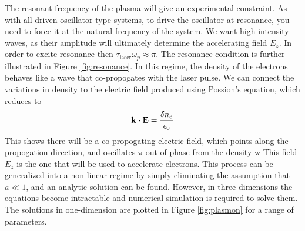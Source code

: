 \documentclass[12pt,letter]{article}
\begin{document}
The resonant frequency of the plasma will give an experimental constraint. As
with all driven-oscillator type systems, to drive the oscillator at resonance,
you need to force it at the natural frequency of the system. We want
high-intensity waves, as their amplitude will ultimately determine the
accelerating field $E_z$. In order to excite resonance then $\tau_\textrm{laser}
\omega_p \approx \pi$. The resonance condition is further illustrated in Figure
\ref{fig:resonance}.
In this regime, the density of the electrons behaves like a wave that
co-propogates with the laser pulse. We can connect the variations in density to
the electric field produced using Possion's equation, which reduces to
\begin{equation}
    \vb{k}\dotproduct\vb{E} = \frac{\delta n_e}{\epsilon_0}
\end{equation}
This shows there will be a co-propogating electric field, which points along
the propogation direction, and oscillates $\pi$ out of phase from the density
w
This field $E_z$ is the one that will be used to accelerate electrons.
This process can be generalized into a non-linear regime by simply eliminating
the assumption that $a \ll 1$, and an analytic solution can be found. However, in three
dimensions the equations become intractable and numerical simulation is
required to solve them. The solutions in one-dimension are plotted in Figure \ref{fig:plasmon}
for a range of parameters.
\end{document}
